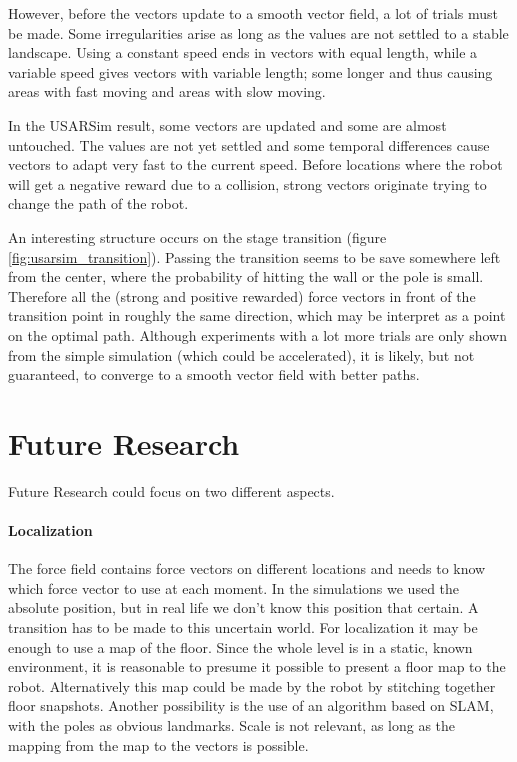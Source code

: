 \documentclass[11pt]{article}
\begin{document}
However, before the vectors update to a smooth vector field, a lot of trials must be made. Some irregularities arise as long as the values are not settled to a stable landscape. Using a constant speed ends in vectors with equal length, while a variable speed gives vectors with variable length; some longer and thus causing areas with fast moving and areas with slow moving.

In the USARSim result, some vectors are updated and some are almost untouched. The values are not yet settled and some temporal differences cause vectors to adapt very fast to the current speed. Before locations where the robot will get a negative reward due to a collision, strong vectors originate trying to change the path of the robot.

An interesting structure occurs on the stage transition (figure \ref{fig:usarsim_transition}). Passing the transition seems to be save somewhere left from the center, where the probability of hitting the wall or the pole is small. Therefore all the (strong and positive rewarded) force vectors in front of the transition point in roughly the same direction, which may be interpret as a point on the optimal path. Although experiments with a lot more trials are only shown from the simple simulation (which could be accelerated), it is likely, but not guaranteed, to converge to a smooth vector field with better paths.



\section{Future Research}
\label{sec:future}

Future Research could focus on two different aspects.

\paragraph{Localization}

The force field contains force vectors on different locations and needs to know which force vector to use at each moment. In the simulations we used the absolute position, but in real life we don't know this position that certain. A transition has to be made to this uncertain world. For localization it may be enough to use a map of the floor. Since the whole level is in a static, known environment, it is reasonable to presume it possible to present a floor map to the robot. Alternatively this map could be made by the robot by stitching together floor snapshots. Another possibility is the use of an algorithm based on SLAM, with the poles as obvious landmarks. Scale is not relevant, as long as the mapping from the map to the vectors is possible.
\end{document}
